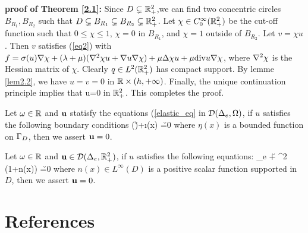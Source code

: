 \documentclass[12pt]{iopart}
\begin{document}
	{\bf proof of Theorem \ref{2.1}:} Since $D\subsetneq{\mathbb{R}}^2_+$,we can find two concentric circles $B_{R_1},B_{R_2}$ such that $D\subsetneq B_{R_1}\subsetneq B_{R_2}  \subsetneq {\mathbb{R}}^2_+$. Let $\chi \in C_{0}^{\infty}({\mathbb{R}}^2_+)$ be the cut-off function such that $0 \leq \chi \leq 1$, $\chi=0$ in $B_{R_1}$, and $\chi=1$ outside of $B_{R_2}$.
	Let $v=\chi u$.
	Then $v$ satisfies (\ref{eq2}) with
	$f=\sigma(u)\nabla\chi+(\lambda+\mu)(\nabla^2 \chi u+ \nabla u \nabla\chi)+\mu\Delta\chi u +\mu\mathrm{div} u\nabla\chi$, where $\nabla^2 \chi$ is the Hessian matrix of $\chi$. Clearly $q\in L^2({\mathbb{R}}^2_+)$ has compact support. By lemme \ref{lem2.2}, we have $u=v=0$ in ${\mathbb{R}}\times(h,+\infty)$. Finally, the unique continuation principle \cite{Morassi2001STRONG}
	implies that u=0 in ${\mathbb{R}}^2_+$. This completes the proof. 
	\finproof
	
\begin{thm}\label{2.2}
	Let $\omega\in {\mathbb{R}}$ and $\mathbf{u}$ statisfy the equations (\ref{elastic_eq} in $\mathcal{D}(\Delta_e,\Omega)$, if $u$ satisfies the following boundary conditions
	\ben
	\sigma(\u)\nu +\i\eta(x) \u =0
	\een
	where $\eta(x)$ is a bounded function on $\Gamma_D$,
	then we assert $\mathbf{u}=0$.
\end{thm}
	
\begin{thm}\label{2.3}
	Let $\omega\in {\mathbb{R}}$ and $\mathbf{u}\in\mathcal{D}(\Delta_e,{\mathbb{R}}^2_+)$, if $u$ satisfies the following equations:
	\ben
	\De_e \u + \om^2 (1+n(x)) \u =0
	\een
	where $n(x)\in L^{\infty}(D)$ is a positive scalar function supported in $D$,
	then we assert $\mathbf{u}=0$.
\end{thm}
	\section*{References}
	
\end{document}
